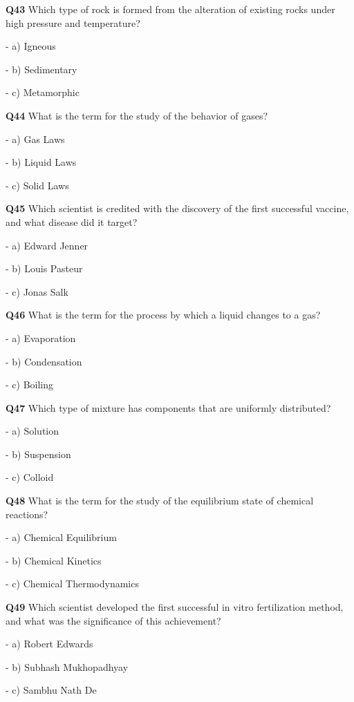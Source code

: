 \textbf{Q43} Which type of rock is formed from the alteration of existing rocks under high pressure and temperature?\par
\quad - a) Igneous\par
\quad - b) Sedimentary\par
\quad - c) Metamorphic\par

\textbf{Q44} What is the term for the study of the behavior of gases?\par
\quad - a) Gas Laws\par
\quad - b) Liquid Laws\par
\quad - c) Solid Laws\par

\textbf{Q45} Which scientist is credited with the discovery of the first successful vaccine, and what disease did it target?\par
\quad - a) Edward Jenner\par
\quad - b) Louis Pasteur\par
\quad - c) Jonas Salk\par

\textbf{Q46} What is the term for the process by which a liquid changes to a gas?\par
\quad - a) Evaporation\par
\quad - b) Condensation\par
\quad - c) Boiling\par

\textbf{Q47} Which type of mixture has components that are uniformly distributed?\par
\quad - a) Solution\par
\quad - b) Suspension\par
\quad - c) Colloid\par

\textbf{Q48} What is the term for the study of the equilibrium state of chemical reactions?\par
\quad - a) Chemical Equilibrium\par
\quad - b) Chemical Kinetics\par
\quad - c) Chemical Thermodynamics\par

\textbf{Q49} Which scientist developed the first successful in vitro fertilization method, and what was the significance of this achievement?\par
\quad - a) Robert Edwards\par
\quad - b) Subhash Mukhopadhyay\par
\quad - c) Sambhu Nath De\par

